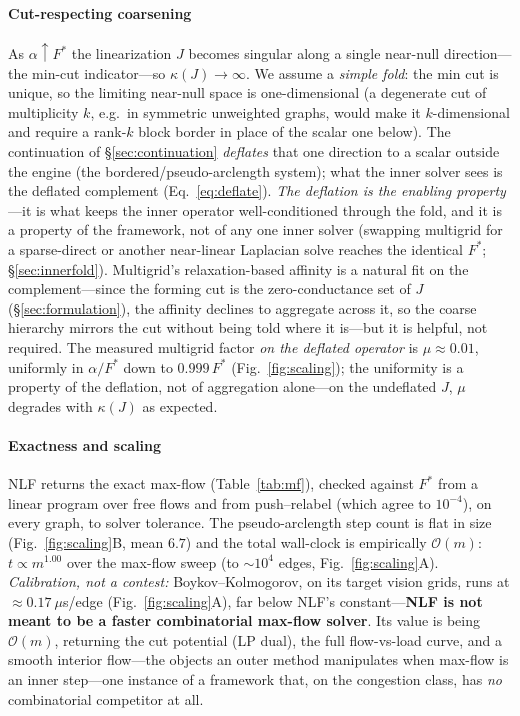 \documentclass{siamart220329}
\newcommand{\Om}{\mathcal{O}(m)}
\begin{document}
\paragraph{Cut-respecting coarsening} As $\alpha\uparrow F^*$ the linearization $J$ becomes singular
along a single near-null direction---the min-cut indicator---so $\kappa(J)\to\infty$. We assume a
\emph{simple fold}: the min cut is unique, so the limiting near-null space is one-dimensional (a
degenerate cut of multiplicity $k$, e.g.\ in symmetric unweighted graphs, would make it $k$-dimensional
and require a rank-$k$ block border in place of the scalar one below). The continuation
of \S\ref{sec:continuation} \emph{deflates} that one direction to a scalar outside the engine (the
bordered/pseudo-arclength system); what the inner solver sees is the deflated complement
(Eq.~\ref{eq:deflate}). \emph{The
deflation is the enabling property}---it is what keeps the inner operator well-conditioned through the
fold, and it is a property of the framework, not of any one inner solver (swapping multigrid for a
sparse-direct or another near-linear Laplacian solve reaches the identical $F^*$;
\S\ref{sec:innerfold}).
Multigrid's relaxation-based affinity is a natural fit on the complement---since the forming cut is the
zero-conductance set of $J$ (\S\ref{sec:formulation}), the affinity declines to aggregate across it, so
the coarse hierarchy mirrors the cut without being told where it is---but it is helpful, not required.
The measured multigrid factor \emph{on the deflated operator} is $\mu\approx0.01$, uniformly in
$\alpha/F^*$ down to $0.999\,F^*$ (Fig.~\ref{fig:scaling}); the uniformity is a property of the
deflation, not of aggregation alone---on the undeflated $J$, $\mu$ degrades with $\kappa(J)$ as
expected.

\paragraph{Exactness and scaling} NLF returns the exact max-flow (Table~\ref{tab:mf}), checked
against $F^*$ from a linear program over free flows and from push--relabel (which agree to $10^{-4}$),
on every graph, to solver tolerance. The pseudo-arclength step count is flat in size
(Fig.~\ref{fig:scaling}B, mean $6.7$) and the total wall-clock is empirically $\Om$: $t\propto m^{1.00}$
over the max-flow sweep (to ${\sim}10^4$ edges, Fig.~\ref{fig:scaling}A). \emph{Calibration, not a contest:}
Boykov--Kolmogorov, on its target vision grids, runs at $\approx0.17~\mu$s/edge
(Fig.~\ref{fig:scaling}A), far below NLF's constant---\textbf{NLF is not meant to be a faster
combinatorial max-flow solver}. Its value is being $\Om$, returning the cut potential (LP dual), the
full flow-vs-load curve, and a smooth interior flow---the objects an outer method manipulates when
max-flow is an inner step---one instance of a framework that, on the congestion class, has \emph{no}
combinatorial competitor at all.
\end{document}

